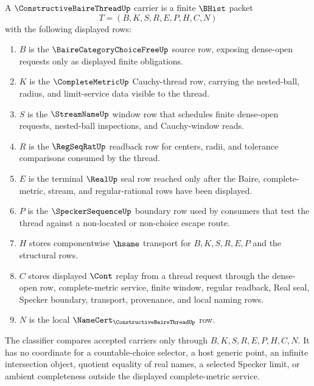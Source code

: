 \begin{definition}
\label{def:constructive-baire-thread-carrier}
A $\ConstructiveBaireThreadUp$ carrier is a finite $\BHist$ packet
$$
T=(B,K,S,R,E,P,H,C,N)
$$
with the following displayed rows:
\begin{enumerate}
\item $B$ is the $\BaireCategoryChoiceFreeUp$ source row, exposing dense-open requests only as displayed finite obligations.
\item $K$ is the $\CompleteMetricUp$ Cauchy-thread row, carrying the nested-ball, radius, and limit-service data visible to the thread.
\item $S$ is the $\StreamNameUp$ window row that schedules finite dense-open requests, nested-ball inspections, and Cauchy-window reads.
\item $R$ is the $\RegSeqRatUp$ readback row for centers, radii, and tolerance comparisons consumed by the thread.
\item $E$ is the terminal $\RealUp$ seal row reached only after the Baire, complete-metric, stream, and regular-rational rows have been displayed.
\item $P$ is the $\SpeckerSequenceUp$ boundary row used by consumers that test the thread against a non-located or non-choice escape route.
\item $H$ stores componentwise $\hsame$ transport for $B,K,S,R,E,P$ and the structural rows.
\item $C$ stores displayed $\Cont$ replay from a thread request through the dense-open row, complete-metric service, finite window, regular readback, Real seal, Specker boundary, transport, provenance, and local naming rows.
\item $N$ is the local $\NameCert_{\ConstructiveBaireThreadUp}$ row.
\end{enumerate}
The classifier compares accepted carriers only through $B,K,S,R,E,P,H,C,N$. It has no coordinate for a countable-choice selector, a host generic point, an infinite intersection object, quotient equality of real names, a selected Specker limit, or ambient completeness outside the displayed complete-metric service.
\end{definition}

